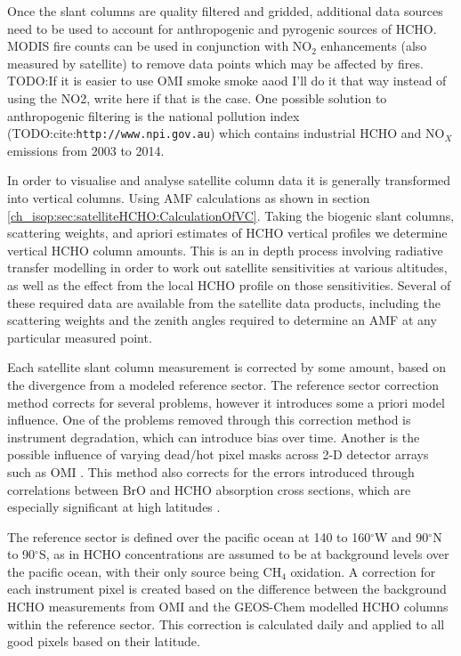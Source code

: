     Once the slant columns are quality filtered and gridded, additional data sources need to be used to account for anthropogenic and pyrogenic sources of HCHO.
    MODIS fire counts can be used in conjunction with NO$_2$ enhancements (also measured by satellite) to remove data points which may be affected by fires. 
    TODO:If it is easier to use OMI smoke smoke aaod I'll do it that way instead of using the NO2, write here if that is the case.
    One possible solution to anthropogenic filtering is the national pollution index (TODO:cite:\verb|http://www.npi.gov.au|) which contains industrial HCHO and NO$_X$ emissions from 2003 to 2014.
    
    In order to visualise and analyse satellite column data it is generally transformed into vertical columns. 
    Using AMF calculations as shown in section \ref{ch_isop:sec:satelliteHCHO:CalculationOfVC}.
    Taking the biogenic slant columns, scattering weights, and apriori estimates of HCHO vertical profiles we determine vertical HCHO column amounts.
    This is an in depth process involving radiative transfer modelling in order to work out satellite sensitivities at various altitudes, as well as the effect from the local HCHO profile on those sensitivities.
    Several of these required data are available from the satellite data products, including the scattering weights and the zenith angles required to determine an AMF at any particular measured point.
    
    Each satellite slant column measurement is corrected by some amount, based on the divergence from a modeled reference sector.
    The reference sector correction method corrects for several problems, however it introduces some a priori model influence.
    One of the problems removed through this correction method is instrument degradation, which can introduce bias over time.
    Another is the possible influence of varying dead/hot pixel masks across 2-D detector arrays such as OMI \citep{DeSmedt2015}.
    This method also corrects for the errors introduced through correlations between BrO and HCHO absorption cross sections, which are especially significant at high latitudes \citep{Gonzalez2015}.
    
    The reference sector is defined over the pacific ocean at 140 to 160$^{\circ}$W and 90$^{\circ}$N to 90$^{\circ}$S, as in \citet{Gonzalez2015}
    HCHO concentrations are assumed to be at background levels over the pacific ocean, with their only source being CH$_4$ oxidation.
    A correction for each instrument pixel is created based on the difference between the background HCHO measurements from OMI and the GEOS-Chem modelled HCHO columns within the reference sector.
    This correction is calculated daily and applied to all good pixels based on their latitude.
    
